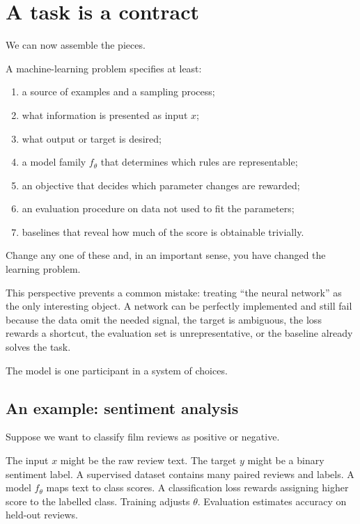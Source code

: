 \section{A task is a contract}

We can now assemble the pieces.

A machine-learning problem specifies at least:

\begin{enumerate}[leftmargin=*]
  \item a source of examples and a sampling process;
  \item what information is presented as input \(x\);
  \item what output or target is desired;
  \item a model family \(f_\theta\) that determines which rules are representable;
  \item an objective that decides which parameter changes are rewarded;
  \item an evaluation procedure on data not used to fit the parameters;
  \item baselines that reveal how much of the score is obtainable trivially.
\end{enumerate}

Change any one of these and, in an important sense, you have changed the learning problem.

This perspective prevents a common mistake: treating ``the neural network'' as the only interesting object. A network can be perfectly implemented and still fail because the data omit the needed signal, the target is ambiguous, the loss rewards a shortcut, the evaluation set is unrepresentative, or the baseline already solves the task.

The model is one participant in a system of choices.

\subsection{An example: sentiment analysis}

Suppose we want to classify film reviews as positive or negative.

The input \(x\) might be the raw review text. The target \(y\) might be a binary sentiment label. A supervised dataset contains many paired reviews and labels. A model \(f_\theta\) maps text to class scores. A classification loss rewards assigning higher score to the labelled class. Training adjusts \(\theta\). Evaluation estimates accuracy on held-out reviews.

